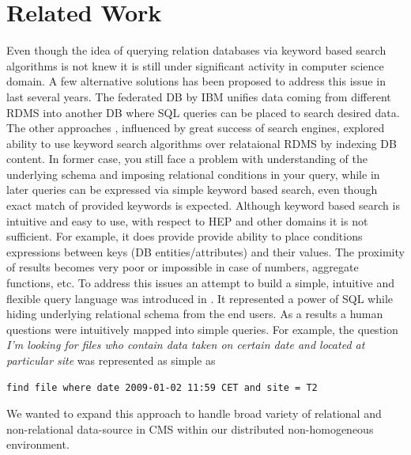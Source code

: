 \documentclass[a4paper]{jpconf}
\begin{document}
\section{Related Work\label{RelatedWork}}
Even though the idea of querying relation databases via keyword based search
algorithms is not knew it is still under significant activity in computer
science domain. A few alternative solutions has been proposed to address this issue
in last several years. The federated DB \cite{FedDB} by IBM unifies data coming 
from different RDMS into another DB where SQL queries can be placed to search desired
data. The other approaches \cite{DBXplorer, QueryAnswer}, influenced by great success
of search engines, explored ability to use keyword search algorithms over relataional RDMS
by indexing DB content. In former case, you still face a problem with understanding 
of the underlying schema and imposing relational conditions in your query, while 
in later queries can be expressed via simple keyword based search, even though exact match
of provided keywords is expected. Although keyword based search is
intuitive and easy to use, with respect to HEP and other domains it is not sufficient. 
For example, it does provide provide ability to place conditions expressions between
keys (DB entities/attributes) and their values. The proximity of results becomes very poor
or impossible in case of numbers, aggregate functions, etc. To address this issues
an attempt to build a simple, intuitive and flexible query language was introduced
in \cite{DBS-QL}. It represented a power of SQL while
hiding underlying relational schema from the end users. As a results
a human questions were intuitively mapped into simple queries. For example,
the question
{\it I'm looking for files who contain data taken on certain date and located at
particular site} was represented as simple as
\begin{verbatim}
find file where date 2009-01-02 11:59 CET and site = T2
\end{verbatim}
We wanted to expand this approach to handle broad variety of relational and
non-relational data-source in CMS within our distributed non-homogeneous environment.

\end{document}
